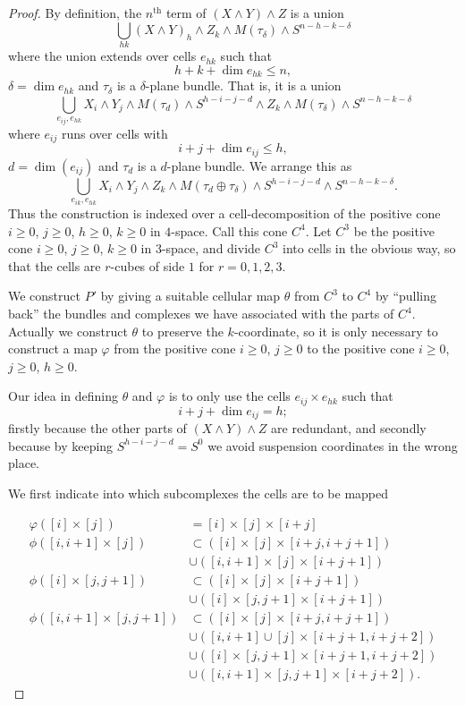 \documentclass[../main]{subfiles}
\begin{document}
\begin{proof}
By definition, the $n^{\mathrm{th}}$ term of $(X \wedge Y) \wedge Z$ is a union $$\bigcup_{hk} (X \wedge Y)_h \wedge Z_k \wedge M(\tau_\delta) \wedge S^{n - h - k - \delta}$$ where the union extends over cells $e_{hk}$ such that $$h + k + \dim e_{hk} \le n,$$ $\delta = \dim e_{hk}$ and $\tau_\delta$ is a $\delta$-plane bundle. That is, it is a union $$\bigcup_{e_{ij}, e_{hk}} X_i \wedge Y_j \wedge M(\tau_d) \wedge S^{h - i - j - d} \wedge Z_k \wedge M(\tau_\delta) \wedge S^{n - h - k - \delta}$$ where $e_{ij}$ runs over cells with $$i + j + \dim e_{ij} \le h,$$ $d = \dim(e_{ij})$ and $\tau_d$ is a $d$-plane bundle. We arrange this as $$\bigcup_{e_{ik}, e_{hk}} X_i \wedge Y_j \wedge Z_k \wedge M(\tau_d \oplus \tau_\delta) \wedge S^{h - i - j - d} \wedge S^{n - h - k - \delta}.$$ Thus the construction is indexed over a cell-decomposition of the positive cone $i \ge 0$, $j \ge 0$, $h \ge 0$, $k \ge 0$ in $4$-space. Call this cone $C^4$. Let $C^3$ be the positive cone $i \ge 0$, $j \ge 0$, $k \ge 0$ in $3$-space, and divide $C^3$ into cells in the obvious way, so that the cells are $r$-cubes of side $1$ for $r = 0, 1, 2, 3$. 

We construct $P'$ by giving a suitable cellular map $\theta$ from $C^3$ to $C^4$ by ``pulling back'' the bundles and complexes we have associated with the parts of $C^4$. Actually we construct $\theta$ to preserve the $k$-coordinate, so it is only necessary to construct a map $\varphi$ from the positive cone $i \ge 0$, $j \ge 0$ to the positive cone $i \ge 0$, $j \ge 0$, $h \ge 0$.

Our idea in defining $\theta$ and $\varphi$ is to only use the cells $e_{ij} \times e_{hk}$ such that $$i + j + \dim e_{ij} = h;$$ firstly because the other parts of $(X \wedge Y) \wedge Z$ are redundant, and secondly because by keeping $S^{h - i - j - d} = S^0$ we avoid suspension coordinates in the wrong place.

We first indicate into which subcomplexes the cells are to be mapped 

\begin{align*}
\varphi([i] \times [j]) & = [i] \times [j] \times [i + j] \\ \phi([i, i + 1] \times [j]) & \subset ([i] \times [j] \times [i + j, i + j + 1]) \\ & \cup ([i, i + 1] \times [j] \times [i + j + 1]) \\ \phi([i] \times [j, j + 1]) & \subset ([i] \times [j] \times [i + j + 1]) \\ & \cup ([i] \times [j, j + 1] \times [i + j + 1]) \\ \phi([i, i + 1] \times [j, j + 1]) & \subset ([i] \times [j] \times [i + j, i + j + 1]) \\ & \cup ([i, i + 1] \cup [j] \times [i + j + 1, i + j + 2]) \\ & \cup ([i] \times [j, j + 1] \times [i +j + 1, i + j + 2]) \\ & \cup ([i, i + 1] \times [j, j + 1] \times [i + j + 2]).
\end{align*}


\end{proof}
\end{document}
